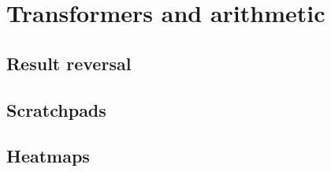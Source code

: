 \section{Transformers and arithmetic}

\subsection{Result reversal}
\label{arith:reversal}

\subsection{Scratchpads}
\label{arith:scratchpad}

\subsection{Heatmaps}
\label{arith:heatmap}